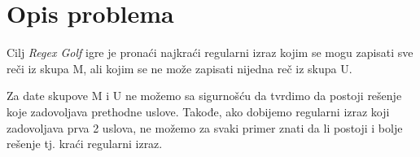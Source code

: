 \section{Opis problema}
    
    \frame{\sectionpage}
    
    \begin{frame}{}
        Cilj \textit{Regex Golf} igre je pronaći najkraći regularni
    izraz kojim se mogu zapisati sve reči iz skupa M, ali kojim se ne može zapisati nijedna reč iz skupa U. 
    \end{frame}
    
    \begin{frame}{}
    Za date skupove M i U ne možemo sa sigurnošću da tvrdimo da postoji rešenje
    koje zadovoljava prethodne uslove. Takođe, ako dobijemo regularni izraz koji zadovoljava prva 2 uslova, ne možemo za svaki primer znati da li postoji i bolje rešenje tj. kraći regularni izraz.
    \end{frame}